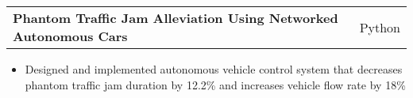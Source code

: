\documentclass[letterpaper,11pt]{article}
\makeatletter
\newcommand{\resitem}[1]{\item[--] #1}
\newcommand{\ressubheading}[4]{
	\vspace{3pt}
	\begin{tabular*}{7.5in}{l@{\extracolsep{\fill}}r}
			\textbf{#1} & #2 \\
			\textit{#3} & \textit{#4}
	\end{tabular*}
}
\newcommand{\projsubheading}[2]{
	\vspace{3pt}
	\begin{tabular*}{7.5in}{l@{\extracolsep{\fill}}r}
		\textbf{#1} & #2
	\end{tabular*}
}
\makeatother
\begin{document}

\projsubheading{Phantom Traffic Jam Alleviation Using Networked Autonomous Cars}
			   {Python}
\begin{itemize}
	\resitem{
		Designed and implemented autonomous vehicle control system that
		decreases phantom traffic jam duration by 12.2\% and increases vehicle
		flow rate by 18\%
	}
\end{itemize}


\end{document}
